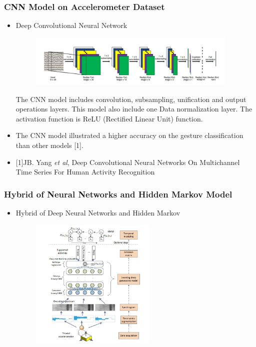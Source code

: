 \documentclass{beamer} %
\begin{document}
\begin{frame}
\frametitle{CNN Model on Accelerometer Dataset}

\begin{itemize}
\item Deep Convolutional Neural Network

 \begin{figure}[htbp] 
	
	\begin{center}
		\includegraphics[width=10cm]{./image/a1} 
		\label{fig:sensor}		
	\end{center}
 \end{figure}

The CNN model includes convolution, subsampling, unification and output operations layers. This model also include one Data normalization layer. The activation function is ReLU (Rectified Linear Unit) function. 

\item The CNN model illustrated a higher accuracy on the gesture classification than other models [1].

\item \tiny [1]{JB. Yang \textit{et al}, Deep Convolutional Neural Networks On Multichannel Time Series For Human Activity Recognition}
\end{itemize}

\end{frame}

\begin{frame}
\frametitle{Hybrid of Neural Networks and Hidden Markov Model}

\begin{itemize}
\item Hybrid of Deep Neural Networks and Hidden Markov 

 \begin{figure}[htbp] 
	
	\begin{center}
		\includegraphics[width=6cm]{./image/a2} 	
	\end{center}
\end{figure}

\end{itemize}

\end{frame}
\end{document}
